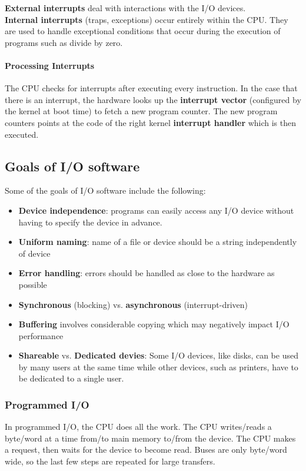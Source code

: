 \documentclass{article}
\newcommand{\bold}[1]{\textbf{#1}}
\renewcommand{\b}{\item[$\circ$]}
\newcommand{\newlist}{\begin{itemize}}
\renewcommand{\endlist}{\end{itemize}}
\begin{document}
\bold{External interrupts} deal with interactions with the I/O devices. \\

\bold{Internal interrupts} (traps, exceptions) occur entirely within the CPU. They are used to handle exceptional conditions that occur during the execution of programs such as divide by zero. \\ 

\paragraph{Processing Interrupts}

The CPU checks for interrupts after executing every instruction. In the case that there is an interrupt, the hardware looks up the \bold{interrupt vector} (configured by the kernel at boot time) to fetch a new program counter. The new program counters points at the code of the right kernel \bold{interrupt handler} which is then executed. 

\subsection{Goals of I/O software}

Some of the goals of I/O software include the following:

\newlist 
\b \bold{Device independence}: programs can easily access any I/O device without having to specify the device in advance.
\b \bold{Uniform naming}: name of a file or device should be a string independently of device
\b \bold{Error handling}: errors should be handled as close to the hardware as possible
\b \bold{Synchronous} (blocking) vs. \bold{asynchronous} (interrupt-driven)
\b \bold{Buffering} involves considerable copying which may negatively impact I/O performance
\b \bold{Shareable} vs. \bold{Dedicated devies}: Some I/O devices, like disks, can be used by many users at the same time while other devices, such as printers, have to be dedicated to a single user.
\endlist 

\subsubsection{Programmed I/O}

In programmed I/O, the CPU does all the work. The CPU writes/reads a byte/word at a time from/to main memory to/from the device. The CPU makes a request, then waits for the device to become read. Buses are only byte/word wide, so the last few steps are repeated for large transfers. \\ 
\end{document}
